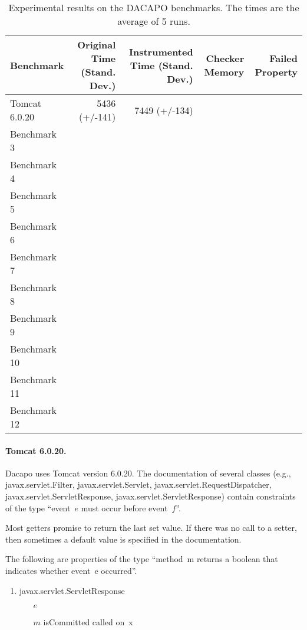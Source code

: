 \documentclass{sigplanconf}[10pt] %
\begin{document}
\begin{table*}[t]
      \centering
   \begin{tabular}{| l | r | r | r | r | }
   \hline
  Benchmark  & Original Time (Stand. Dev.) & Instrumented Time (Stand. Dev.) & Checker Memory & Failed Property
\\ \hline \hline
Tomcat 6.0.20 &  5436 (+/-141) & 7449 (+/-134) & &
\\ \hline
Benchmark 3 & & &  &
\\ \hline
Benchmark 4 & & &  &
\\ \hline
Benchmark 5 & & &  &
\\ \hline
Benchmark 6 & & &  &
\\ \hline
Benchmark 7 & & &  &
\\ \hline
Benchmark 8 & & &  &
\\ \hline
Benchmark 9 & & &  &
\\ \hline
Benchmark 10 & & &  &
\\ \hline
Benchmark 11 & & &  &
\\ \hline
Benchmark 12 & & &  &
\\ \hline
\end{tabular}
    \caption{Experimental results on the DACAPO benchmarks. The times are the average of 5 runs.}
   \label{tab:booktabs}
\end{table*}

\paragraph{Tomcat 6.0.20.}
Dacapo uses Tomcat version 6.0.20. The documentation of several classes (e.g., \textsf{javax.servlet.Filter}, \textsf{javax.servlet.Servlet}, \textsf{javax.servlet.RequestDispatcher}, \textsf{javax.servlet.ServletResponse}, \textsf{javax.servlet.ServletResponse}) contain constraints of the type ``event~$e$ must occur before event~$f$''.

Most getters promise to return the last set value.
If there was no call to a setter, then sometimes a default value is specified in the documentation.

The following are properties of the type ``method~\textsf{m} returns a boolean that indicates whether event~\textsf{e} occurred''.

\begin{enumerate}
\item
\textsf{javax.servlet.ServletResponse}
  \begin{itemize}
  \item[$e$]
  \item[$m$] \textsf{isCommitted} called on~\textsf{x}
  \end{itemize}
\end{enumerate}
\end{document}
